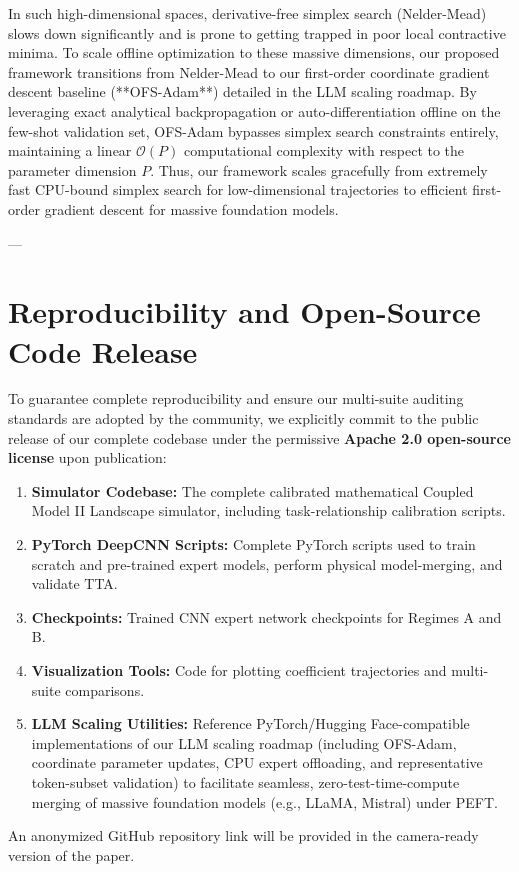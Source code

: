 In such high-dimensional spaces, derivative-free simplex search (Nelder-Mead) slows down significantly and is prone to getting trapped in poor local contractive minima.
To scale offline optimization to these massive dimensions, our proposed framework transitions from Nelder-Mead to our first-order coordinate gradient descent baseline (**OFS-Adam**) detailed in the LLM scaling roadmap.
By leveraging exact analytical backpropagation or auto-differentiation offline on the few-shot validation set, OFS-Adam bypasses simplex search constraints entirely, maintaining a linear $\mathcal{O}(P)$ computational complexity with respect to the parameter dimension $P$.
Thus, our framework scales gracefully from extremely fast CPU-bound simplex search for low-dimensional trajectories to efficient first-order gradient descent for massive foundation models.

---

\section{Reproducibility and Open-Source Code Release}
\label{app:reproducibility}

To guarantee complete reproducibility and ensure our multi-suite auditing standards are adopted by the community, we explicitly commit to the public release of our complete codebase under the permissive \textbf{Apache 2.0 open-source license} upon publication:
\begin{enumerate}
    \item \textbf{Simulator Codebase:} The complete calibrated mathematical Coupled Model II Landscape simulator, including task-relationship calibration scripts.
    \item \textbf{PyTorch DeepCNN Scripts:} Complete PyTorch scripts used to train scratch and pre-trained expert models, perform physical model-merging, and validate TTA.
    \item \textbf{Checkpoints:} Trained CNN expert network checkpoints for Regimes A and B.
    \item \textbf{Visualization Tools:} Code for plotting coefficient trajectories and multi-suite comparisons.
    \item \textbf{LLM Scaling Utilities:} Reference PyTorch/Hugging Face-compatible implementations of our LLM scaling roadmap (including OFS-Adam, coordinate parameter updates, CPU expert offloading, and representative token-subset validation) to facilitate seamless, zero-test-time-compute merging of massive foundation models (e.g., LLaMA, Mistral) under PEFT.
\end{enumerate}
An anonymized GitHub repository link will be provided in the camera-ready version of the paper.
